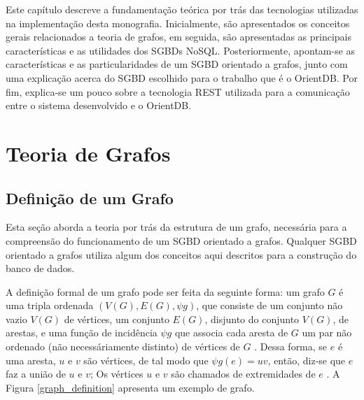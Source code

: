 \newcommand{\texCommand}[1]{\texttt{\textbackslash{#1}}}%

\newcommand{\exemplo}[1]{%
\vspace{\baselineskip}%
\noindent\fbox{\begin{minipage}{\textwidth}#1\end{minipage}}%
\\\vspace{\baselineskip}}%

\newcommand{\exemploVerbatim}[1]{%
\vspace{\baselineskip}%
\noindent\fbox{\begin{minipage}{\textwidth}%
#1\end{minipage}}%
\\\vspace{\baselineskip}}%

Este capítulo descreve a fundamentação teórica por trás das tecnologias utilizadas na implementação desta monografia. Inicialmente, são apresentados os conceitos gerais relacionados a teoria de grafos, em seguida, são apresentadas as principais características e as utilidades dos SGBDs NoSQL. Posteriormente, apontam-se as características e as particularidades de um SGBD orientado a grafos, junto com uma explicação acerca do SGBD escolhido para o trabalho que é o OrientDB. Por fim, explica-se um pouco sobre a tecnologia REST utilizada para a comunicação entre o sistema desenvolvido e o OrientDB.

\section{Teoria de Grafos} \label{graph_theory}

\subsection{Definição de um Grafo}
	Esta seção aborda a teoria por trás da estrutura de um grafo, necessária para a compreensão do funcionamento de um SGBD orientado a grafos. Qualquer SGBD orientado a grafos utiliza algum dos conceitos aqui descritos para a construção do banco de dados.

	A definição formal de um grafo pode ser feita da seguinte forma: um grafo \(G\) é uma tripla ordenada \((V(G), E(G), \psi g)\), que consiste de um conjunto não vazio \(V(G)\) de vértices, um conjunto \(E(G)\), disjunto do conjunto \(V(G)\), de arestas, e uma função de incidência \(\psi g\) que associa cada aresta de \(G\) um par não ordenado (não necessáriamente distinto) de vértices de \(G\) \cite{bondy1976graph}. Dessa forma, se \(e\) é uma aresta, \(u\) e \(v\) são vértices, de tal modo que \(\psi g(e) = uv\), então, diz-se que \(e\) faz a união de \(u\) e \(v\); Os vértices \(u\) e \(v\) são chamados de extremidades de \(e\) \cite{bondy1976graph}. A Figura \ref{graph_definition} apresenta um exemplo de grafo.
	
